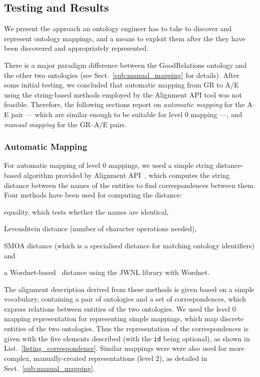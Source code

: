 \subsection{Testing and Results}
\label{testing}

We present the approach an ontology engineer has to take to discover and represent ontology mappings, and a means to exploit them after the they have been discovered and appropriately represented.

There is a major paradigm difference between the GoodRelations ontology and the other two ontologies (see Sect.~\ref{sub:manual_mapping} for details). After some initial testing, we concluded that automatic mapping from GR to A/E using the string-based methods employed by the Alignment API tool was not feasible. Therefore, the following sections report on \emph{automatic mapping} for the A--E pair --- which are similar enough to be suitable for level 0 mapping ---, and \emph{manual mapping} for the GR--A/E pairs.

\subsubsection{Automatic Mapping}
\label{subsubsec:automaticmapping}


For automatic mapping of level 0 mappings, we used a simple string distance-based algorithm provided by Alignment API~\cite{euzenat2004api}, which computes the string distance between the names of the entities to find correspondences between them. Four methods have been used for computing the distance:
\begin{inparaenum}[(1)]
    \item equality, which tests whether the names are identical, 
    \item Levenshtein distance (number of character operations needed), 
    \item SMOA distance (which is a specialised distance for matching ontology identifiers) and
    \item a Wordnet-based~\cite{fellbaum1998wordnet} distance using the JWNL library with Wordnet.
\end{inparaenum}

The alignment description derived from these methods is given based on a simple vocabulary, containing a pair of ontologies and a set of correspondences, which express relations between entities of the two ontologies.
We used the level 0 mapping representation for representing simple mappings, which map discrete entities of the two ontologies. Thus the representation of the correspondences is given with the five elements described (with the \texttt{id} being optional), as shown in List.~\ref{listing_correspondence}. Similar mappings were were also used for more complex, manually-created representations (level 2), as detailed in Sect.~\ref{sub:manual_mapping}.

